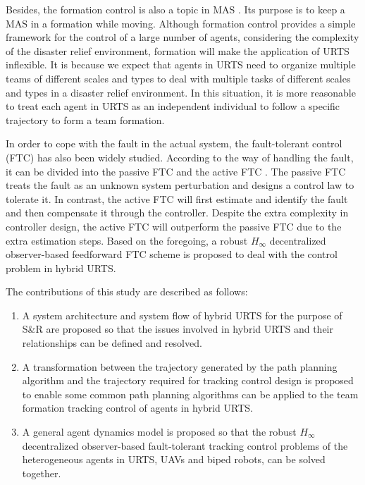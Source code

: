 \documentclass{ieeeaccess}
\begin{document}
Besides, the formation control is also a topic in MAS \cite{wang2022consensus}. Its purpose is to keep a MAS in a formation while moving. Although formation control provides a simple framework for the control of a large number of agents, considering the complexity of the disaster relief environment, formation will make the application of URTS inflexible. It is because we expect that agents in URTS need to organize multiple teams of different scales and types to deal with multiple tasks of different scales and types in a disaster relief environment. In this situation, it is more reasonable to treat each agent in URTS as an independent individual to follow a specific trajectory to form a team formation.

In order to cope with the fault in the actual system, the fault-tolerant control (FTC) has also been widely studied. According to the way of handling the fault, it can be divided into the passive FTC and the active FTC \cite{6669235}. The passive FTC treats the fault as an unknown system perturbation and designs a control law to tolerate it. In contrast, the active FTC will first estimate and identify the fault and then compensate it through the controller. Despite the extra complexity in controller design, the active FTC will outperform the passive FTC due to the extra estimation steps. Based on the foregoing, a robust $H_\infty$ decentralized observer-based feedforward FTC scheme is proposed to deal with the control problem in hybrid URTS.

The contributions of this study are described as follows:
\begin{enumerate}
    \item A system architecture and system flow of hybrid URTS for the purpose of S\&R are proposed so that the issues involved in hybrid URTS and their relationships can be defined and resolved.
    \item A transformation between the trajectory generated by the path planning algorithm and the trajectory required for tracking control design is proposed to enable some common path planning algorithms can be applied to the team formation tracking control of agents in hybrid URTS.
    \item A general agent dynamics model is proposed so that the robust $H_\infty$ decentralized observer-based fault-tolerant tracking control problems of the heterogeneous agents in URTS, UAVs and biped robots, can be solved together.
\end{enumerate}
\end{document}
